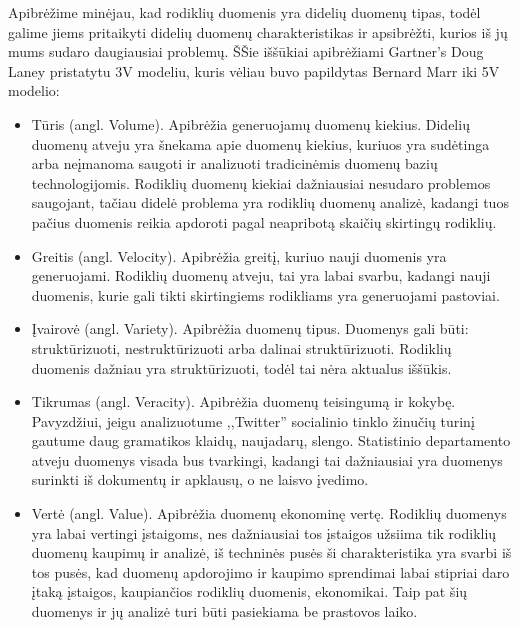 \documentclass{VUMIFPSkursinis}
\begin{document}
Apibrėžime minėjau, kad rodiklių duomenis yra didelių duomenų tipas, todėl galime jiems pritaikyti didelių duomenų charakteristikas ir apsibrėžti, kurios iš jų 
mums sudaro daugiausiai problemų. ŠŠie iššūkiai apibrėžiami Gartner's Doug Laney pristatytu 3V modeliu\cite{laney20013d}, kuris vėliau buvo papildytas Bernard Marr iki 5V modelio\cite{marr2014big}:
\begin{itemize}
    \item Tūris (angl. Volume). Apibrėžia generuojamų duomenų kiekius. Didelių duomenų atveju yra šnekama apie duomenų kiekius, kuriuos yra sudėtinga arba neįmanoma saugoti 
    ir analizuoti tradicinėmis duomenų bazių technologijomis. Rodiklių duomenų kiekiai dažniausiai nesudaro problemos saugojant, tačiau didelė problema yra rodiklių duomenų analizė, 
    kadangi tuos pačius duomenis reikia apdoroti pagal neapribotą skaičių skirtingų rodiklių.
    \item Greitis (angl. Velocity). Apibrėžia greitį, kuriuo nauji duomenis yra generuojami. Rodiklių duomenų atveju, tai yra labai svarbu, kadangi nauji duomenis, kurie gali 
    tikti skirtingiems rodikliams yra generuojami pastoviai.
    \item Įvairovė (angl. Variety). Apibrėžia duomenų tipus. Duomenys gali būti: struktūrizuoti, nestruktūrizuoti arba dalinai struktūrizuoti\cite{zikopoulos2011understanding}. 
    Rodiklių duomenis dažniau yra struktūrizuoti, todėl tai nėra aktualus iššūkis.
    \item Tikrumas (angl. Veracity). Apibrėžia duomenų teisingumą ir kokybę. Pavyzdžiui, jeigu analizuotume ,,Twitter'' socialinio tinklo žinučių turinį gautume daug gramatikos klaidų, naujadarų, slengo. 
    Statistinio departamento atveju duomenys visada bus tvarkingi, kadangi tai dažniausiai yra duomenys surinkti iš dokumentų ir apklausų, o ne laisvo įvedimo.
    \item Vertė (angl. Value). Apibrėžia duomenų ekonominę vertę. Rodiklių duomenys yra labai vertingi įstaigoms, nes dažniausiai tos įstaigos užsiima tik rodiklių duomenų kaupimų ir analizė, iš techninės pusės
    ši charakteristika yra svarbi iš tos pusės, kad duomenų apdorojimo ir kaupimo sprendimai labai stipriai daro įtaką įstaigos, kaupiančios rodiklių duomenis, ekonomikai. Taip pat šių duomenys ir jų 
    analizė turi būti pasiekiama be prastovos laiko.
\end{itemize}
\end{document}
